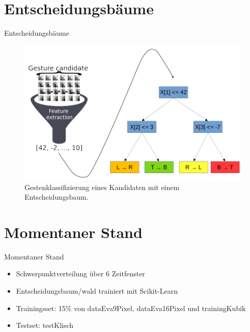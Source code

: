\documentclass[10pt]{beamer}
\begin{document}
\section{Entscheidungsbäume}
\begin{frame}{Entscheidungsbäume}
\begin{figure}
    \centering
    \includegraphics[width=\linewidth]{process_draw.png}
    \caption{Gestenklassifizierung eines Kandidaten mit einem Entscheidungsbaum.}
\end{figure}
\end{frame}

\section{Momentaner Stand}
\begin{frame}{Momentaner Stand}
\begin{itemize}
    \item Schwerpunktverteilung über 6 Zeitfenster
    \item Entscheidungsbaum/wald trainiert mit Scikit-Learn
    \item Trainingsset: 15\% von dataEva9Pixel, dataEva16Pixel und trainingKubik
    \item Testset: testKlisch
\end{itemize}
\end{frame}
\end{document}
